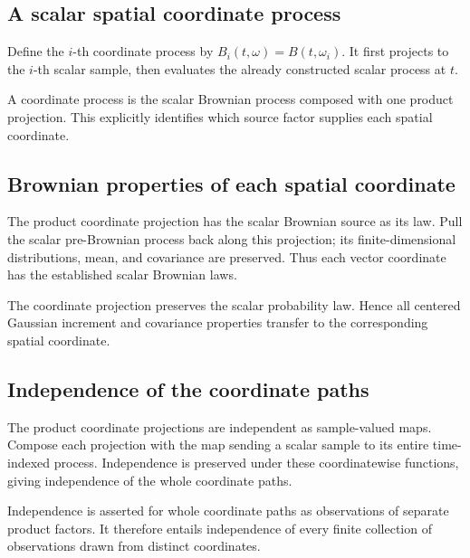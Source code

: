\documentclass[11pt,a4paper]{article}
\begin{document}
\subsection{\texorpdfstring{A scalar spatial coordinate process}{A scalar spatial coordinate process}}


Define the \(i\)-th coordinate process by \(B_i(t,\omega)=B(t,\omega_i)\). It first projects to the \(i\)-th scalar sample, then evaluates the already constructed scalar process at \(t\).



A coordinate process is the scalar Brownian process composed with one product projection. This explicitly identifies which source factor supplies each spatial coordinate.


\subsection{\texorpdfstring{Brownian properties of each spatial coordinate}{Brownian properties of each spatial coordinate}}


The product coordinate projection has the scalar Brownian source as its law. Pull the scalar pre-Brownian process back along this projection; its finite-dimensional distributions, mean, and covariance are preserved. Thus each vector coordinate has the established scalar Brownian laws.



The coordinate projection preserves the scalar probability law. Hence all centered Gaussian increment and covariance properties transfer to the corresponding spatial coordinate.


\subsection{\texorpdfstring{Independence of the coordinate paths}{Independence of the coordinate paths}}


The product coordinate projections are independent as sample-valued maps. Compose each projection with the map sending a scalar sample to its entire time-indexed process. Independence is preserved under these coordinatewise functions, giving independence of the whole coordinate paths.



Independence is asserted for whole coordinate paths as observations of separate product factors. It therefore entails independence of every finite collection of observations drawn from distinct coordinates.
\end{document}
